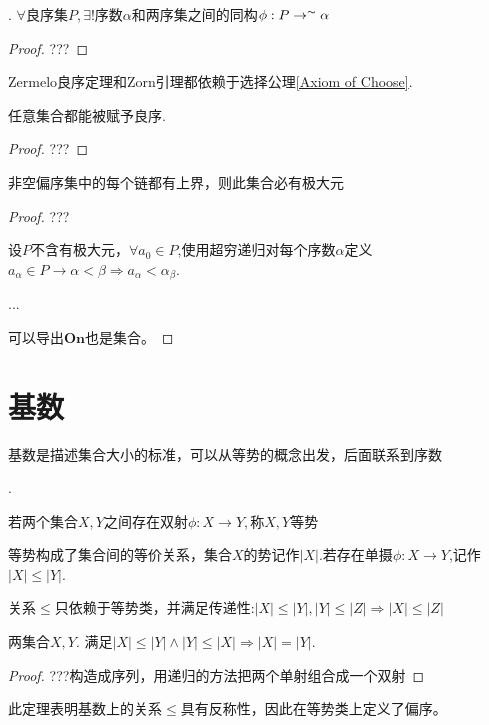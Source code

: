 \begin{Them}[良序集与序数之间必存在唯一同构].
    $\forall \text{良序集}P,\exists !\text{序数}\alpha$和两序集之间的同构$\phi : P \rightarrow^{\thicksim}\alpha$
    \begin{proof}
        ???
    \end{proof}
\end{Them}

Zermelo良序定理和Zorn引理都依赖于选择公理\ref{Axiom of Choose}.

\begin{Them} 任意集合都能被赋予良序.
    \begin{proof}
        ???
    \end{proof}
\end{Them}

\begin{Them}[Zorn 引理] 非空偏序集中的每个链都有上界，则此集合必有极大元
    \begin{proof}
        ???

        设$P$不含有极大元，$\forall a_0 \in P$,使用超穷递归对每个序数$\alpha$定义$a_{\alpha}\in P \rightarrow \alpha <\beta \Rightarrow a_{\alpha}<\alpha_{\beta}$.

        ...

        可以导出$\mathbf{On}$也是集合。
    \end{proof}
    
\end{Them}

\section{基数}

基数是描述集合大小的标准，可以从等势的概念出发，后面联系到序数
\begin{Def}[集合间的等势].

    若两个集合$X,Y$之间存在双射$\phi :X\rightarrow Y,$称$X,Y$等势
\end{Def}
    等势构成了集合间的等价关系，集合$X$的势记作$|X|$.若存在单摄$\phi :X\rightarrow Y$,记作$|X| \leq |Y|$.
    
    关系$\leq $只依赖于等势类，并满足传递性:$|X|\leq |Y|,|Y|\leq |Z| \Rightarrow |X| \leq |Z|$
\begin{Them} 两集合$X,Y$. 满足$|X|\leq |Y| \wedge |Y| \leq |X|\Rightarrow |X|=|Y|$.
    \begin{proof}
        ???构造成序列，用递归的方法把两个单射组合成一个双射
    \end{proof}
\end{Them}
此定理表明基数上的关系$\leq $具有反称性，因此在等势类上定义了偏序。

